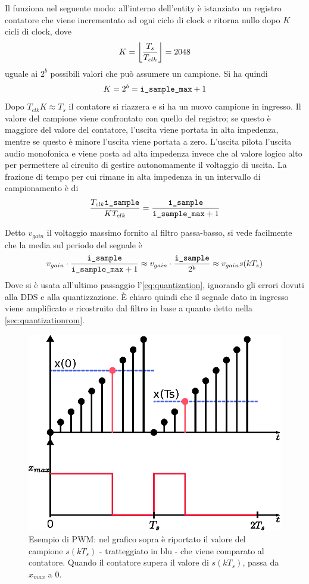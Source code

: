 \begin{center}
\end{center}
Il  funziona nel seguente modo: all'interno dell'entity
è istanziato un registro contatore che viene incrementato ad ogni ciclo di clock
e ritorna nullo dopo $K$ cicli di clock, dove
\[
  K = \floor*{\frac{T_s}{T_{clk}}} = 2048
\]
uguale ai $2^b$ possibili valori che può assumere un campione.
Si ha quindi
\[
  K = 2^b = \code{i\_sample\_max} + 1
\]
Dopo $T_{clk}K \approx T_s$ il contatore si riazzera e si ha un nuovo campione
in ingresso.
Il valore del campione  viene confrontato con quello del registro; se
questo è maggiore del valore del contatore, l'uscita viene portata in alta impedenza,
mentre se questo è minore l'uscita viene portata a zero.
L'uscita  pilota l'uscita audio monofonica e
viene posta ad alta impedenza invece che al valore logico alto per permettere
al circuito di gestire autonomamente il voltaggio di uscita.
La frazione di tempo per cui  rimane in alta impedenza
in un intervallo di campionamento è di
\[
\frac{T_{clk}\code{i\_sample}}{K T_{clk}} = 
\frac{\code{i\_sample}}{\code{i\_sample\_max}+1}
\]

Detto $v_{gain}$ il voltaggio massimo fornito al filtro passa-basso,
si vede facilmente che la media sul periodo del segnale è
\[
v_{gain} \cdot\frac{\code{i\_sample}}{\code{i\_sample\_max}+1}
 \approx v_{gain} \cdot \frac{\code{i\_sample}}{2^\code{b}} \approx v_{gain}s(k T_s)
\]
Dove si è usata all'ultimo passaggio l'\cref{eq:quantization}, ignorando gli errori
dovuti alla DDS e alla quantizzazione.
È chiaro quindi che il segnale dato in ingresso viene amplificato e
ricostruito dal filtro in base a quanto detto nella \cref{sec:quantizationrom}.

\begin{figure}
	\centering
	\def\svgwidth{\columnwidth}
	\includegraphics[width=0.7\columnwidth]{TeX_files/pwm_ramp.eps}
	\caption{Esempio di PWM: nel grafico sopra è riportato il valore del campione $s(kT_s)$ - tratteggiato in blu - che viene comparato al contatore.
	Quando il contatore supera il valore di $s(kT_s)$,  passa da $x_{max}$ a $0$. }
\end{figure}

